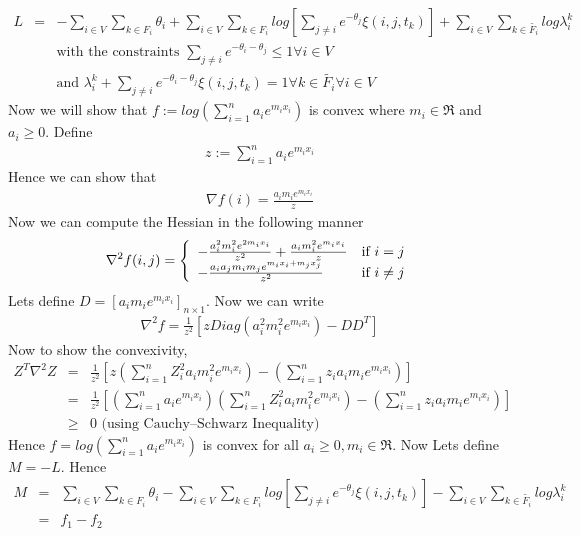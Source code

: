 \begin{eqnarray*}
L  	&=&	-\displaystyle\sum_{i \in V}\displaystyle\sum_{k \in F_i}\theta_i+\displaystyle\sum_{i \in 						V}\displaystyle\sum_{k \in F_i}log[\displaystyle\sum_{j \neq i} e^{-\theta_j}\xi 									(i,j,t_k)]+\displaystyle\sum_{i \in V}\displaystyle\sum_{k \in \widetilde{F_{i}}}log\lambda_{i}^{k}\\
	&& {} \mbox{with the constraints } \displaystyle\sum_{j \neq i}e^{-\theta_i-\theta_j} \leq 1 \forall i \in 			V\\
	&& {} \mbox{and } \lambda_{i}^{k} + \displaystyle\sum_{j \neq i}e^{-\theta_i-\theta_j}\xi(i,j,t_k) = 1 				  \forall k \in \widetilde{F_i} \forall i\in V 
\end{eqnarray*}
Now we will show that $f := log(\displaystyle\sum_{i=1}^{n}a_ie^{m_ix_i})$ is convex where $m_i \in \Re$ and $a_i \geq 0$. Define
\begin{eqnarray*}
z := \displaystyle\sum_{i=1}^{n}a_ie^{m_ix_i}
\end{eqnarray*}
Hence we can show that
\begin{eqnarray*}
\nabla f (i) = \frac{a_im_ie^{m_ix_i}}{z}
\end{eqnarray*}
Now we can compute the Hessian in the following manner
\begin{eqnarray*}
\nabla^2 f(i,j) = \left\{ \begin{array}{ll} -\frac{a_{i}^{2}m_{i}^2e^{2m_ix_i}}{z^2} + \frac{a_im_i^2e^{m_ix_i}}{z} & \mbox{if } i = j \\ -\frac{a_ia_jm_im_je^{m_ix_i+m_jx_j}}{z^2} & \mbox{if } i \neq j \end{array} \right.
\end{eqnarray*}
Lets define $D = [a_im_ie^{m_ix_i}]_{n \times 1}$. Now we can write 
\begin{eqnarray*}
\nabla^2 f = \frac{1}{z^2}[zDiag(a_i^2m_i^2e^{m_ix_i})-DD^T]
\end{eqnarray*}
Now to show the convexivity,
\begin{eqnarray*}
Z^T \nabla^2 Z &=& \frac{1}{z^2}[z(\displaystyle\sum_{i=1}^{n} 																		Z_i^2a_im_i^2e^{m_ix_i})-(\displaystyle\sum_{i=1}^{n}z_ia_im_ie^{m_ix_i})] \\
			   &=& \frac{1}{z^2}[(\displaystyle\sum_{i=1}^{n}a_ie^{m_ix_i})(\displaystyle\sum_{i=1}^{n} 							Z_i^2a_im_i^2e^{m_ix_i}) - (\displaystyle\sum_{i=1}^{n}z _ia_im_ie^{m_ix_i})] \\
			    &\geq& 0 \mbox{ (using Cauchy–Schwarz Inequality)}
\end{eqnarray*}
Hence $f = log(\displaystyle\sum_{i=1}^{n}a_ie^{m_ix_i})$ is convex for all $a_i \geq 0,m_i \in \Re$. Now Lets define $M = -L$. Hence 
\begin{eqnarray*}
M &=& \displaystyle\sum_{i \in V}\displaystyle\sum_{k \in F_i}\theta_i-\displaystyle\sum_{i \in 						V}\displaystyle\sum_{k \in F_i}log[\displaystyle\sum_{j \neq i} e^{-\theta_j}\xi 									(i,j,t_k)]-\displaystyle\sum_{i \in V}\displaystyle\sum_{k \in \widetilde{F_{i}}}log\lambda_{i}^{k} \\
	&=& f_1 - f_2 
\end{eqnarray*}
